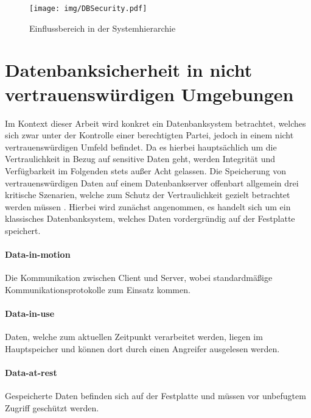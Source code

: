 \begin{figure}
	\texttt{[image: img/DBSecurity.pdf]}
	\centering
	\caption{Einflussbereich in der Systemhierarchie}
	\label{fig:dbsecurity}
\end{figure}

\section{Datenbanksicherheit in nicht vertrauenswürdigen Umgebungen}
Im Kontext dieser Arbeit wird konkret ein Datenbanksystem betrachtet, welches sich zwar unter der Kontrolle einer berechtigten Partei, jedoch in einem nicht vertrauenswürdigen Umfeld befindet. Da es hierbei hauptsächlich um die Vertraulichkeit in Bezug auf sensitive Daten geht, werden Integrität und Verfügbarkeit im Folgenden stets außer Acht gelassen. Die Speicherung von vertrauenswürdigen Daten auf einem Datenbankserver offenbart allgemein drei kritische Szenarien, welche zum Schutz der Vertraulichkeit gezielt betrachtet werden müssen \cite{Shmueli2010}. Hierbei wird zunächst angenommen, es handelt sich um ein klassisches Datenbanksystem, welches Daten vordergründig auf der Festplatte speichert.

\paragraph{Data-in-motion}
Die Kommunikation zwischen Client und Server, wobei standardmäßige Kommunikationsprotokolle zum Einsatz kommen.

\paragraph{Data-in-use}
Daten, welche zum aktuellen Zeitpunkt verarbeitet werden, liegen im Hauptspeicher und können dort durch einen Angreifer ausgelesen werden.

\paragraph{Data-at-rest}
Gespeicherte Daten befinden sich auf der Festplatte und müssen vor unbefugtem Zugriff geschützt werden.

